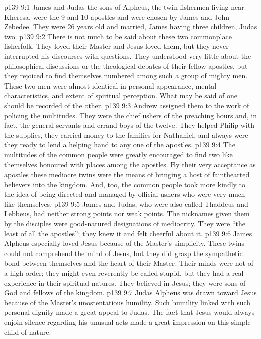 \vs p139 9:1 James and Judas the sons of Alpheus, the twin fishermen living near Kheresa, were the 9 and 10 apostles and were chosen by James and John Zebedee. They were 26 years old and married, James having three children, Judas two.
\vs p139 9:2 \pc There is not much to be said about these two commonplace fisherfolk. They loved their Master and Jesus loved them, but they never interrupted his discourses with questions. They understood very little about the philosophical discussions or the theological debates of their fellow apostles, but they rejoiced to find themselves numbered among such a group of mighty men. These two men were almost identical in personal appearance, mental characteristics, and extent of spiritual perception. What may be said of one should be recorded of the other.
\vs p139 9:3 Andrew assigned them to the work of policing the multitudes. They were the chief ushers of the preaching hours and, in fact, the general servants and errand boys of the twelve. They helped Philip with the supplies, they carried money to the families for Nathaniel, and always were they ready to lend a helping hand to any one of the apostles.
\vs p139 9:4 The multitudes of the common people were greatly encouraged to find two like themselves honoured with places among the apostles. By their very acceptance as apostles these mediocre twins were the means of bringing a host of fainthearted believers into the kingdom. And, too, the common people took more kindly to the idea of being directed and managed by official ushers who were very much like themselves.
\vs p139 9:5 James and Judas, who were also called Thaddeus and Lebbeus, had neither strong points nor weak points. The nicknames given them by the disciples were good\hyp{}natured designations of mediocrity. They were “the least of all the apostles”; they knew it and felt cheerful about it.
\vs p139 9:6 \pc James Alpheus especially loved Jesus because of the Master’s simplicity. These twins could not comprehend the mind of Jesus, but they did grasp the sympathetic bond between themselves and the heart of their Master. Their minds were not of a high order; they might even reverently be called stupid, but they had a real experience in their spiritual natures. They believed in Jesus; they were sons of God and fellows of the kingdom.
\vs p139 9:7 Judas Alpheus was drawn toward Jesus because of the Master’s unostentatious humility. Such humility linked with such personal dignity made a great appeal to Judas. The fact that Jesus would always enjoin silence regarding his unusual acts made a great impression on this simple child of nature.
